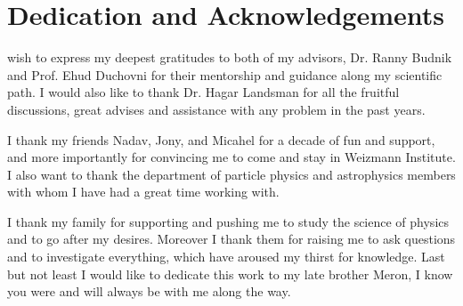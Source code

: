 %
%

\chapter*{Dedication and Acknowledgements}
\begin{SingleSpace}
 wish to express my deepest gratitudes to both of my advisors, Dr. Ranny Budnik and Prof. Ehud Duchovni for their mentorship and guidance along my scientific path. I would also like to thank Dr. Hagar Landsman for all the fruitful discussions, great advises and assistance with any problem in the past years.

I thank my friends Nadav, Jony, and Micahel for a decade of fun and support, and more importantly for convincing me to come and stay in Weizmann Institute. I also want to thank the department of particle physics and astrophysics members with whom I have had a great time working with.
  
I thank my family for supporting and pushing me to study the science of physics and to go after my desires. Moreover I thank them for raising me to ask questions and to investigate everything, which have aroused my thirst for knowledge. Last but not least I would like to dedicate this work to my late brother Meron, I know you were and will always be with me along the way.
\end{SingleSpace}
\clearpage